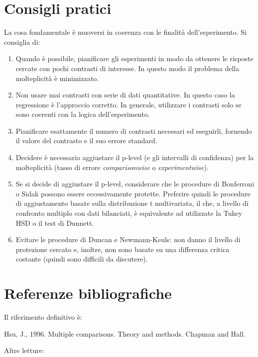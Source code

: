 \documentclass[a4paper,12pt,oneside]{book}
\providecommand{\tightlist}{%
  \setlength{\itemsep}{0pt}\setlength{\parskip}{0pt}}
\theoremstyle{definition}
\theoremstyle{definition}
\theoremstyle{definition}
\theoremstyle{remark}
\begin{document}
\section{Consigli pratici}\label{consigli-pratici}

La cosa fondamentale è muoversi in coerenza con le finalità
dell'esperimento. Si consiglia di:

\begin{enumerate}
\def\labelenumi{\arabic{enumi}.}
\tightlist
\item
  Quando è possibile, pianificare gli esperimenti in modo da ottenere le
  risposte cercate con pochi contrasti di interesse. In questo modo il
  problema della molteplicità è minimizzato.
\item
  Non usare mai contrasti con serie di dati quantitative. In questo caso
  la regressione è l'approccio corretto. In generale, utilizzare i
  contrasti solo se sono coerenti con la logica dell'esperimento.
\item
  Pianificare esattamente il numero di contrasti necessari ed eseguirli,
  fornendo il valore del contrasto e il suo errore standard.
\item
  Decidere è necessario aggiustare il p-level (e gli intervalli di
  confidenza) per la molteplicità (tasso di errore \emph{comparisonwise}
  o \emph{experimentwise}).
\item
  Se si decide di aggiustare il p-level, considerare che le procedure di
  Bonferroni o Sidak possono essere eccessivamente protette. Preferire
  quindi le procedure di aggiustamento basate sulla distribuzione t
  multivariata, il che, a livello di confronto multiplo con dati
  bilanciati, è equivalente ad utilizzate la Tukey HSD o il test di
  Dunnett.
\item
  Evitare le procedure di Duncan e Newmann-Keuls: non danno il livello
  di protezione cercato e, inoltre, non sono basate su una differenza
  critica costante (quindi sono difficili da discutere).
\end{enumerate}

\section{Referenze bibliografiche}\label{referenze-bibliografiche}

Il riferimento definitivo è:

Hsu, J., 1996. Multiple comparisons. Theory and methods. Chapman and
Hall.

Altre letture:
\end{document}
